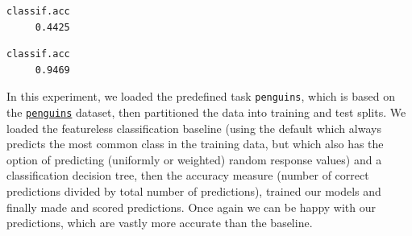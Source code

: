 \begin{Shaded}
\begin{Highlighting}[]
\NormalTok{(}\NormalTok{)}
\OtherTok{=} \NormalTok{(}\NormalTok{)}
\OtherTok{=} 
\OtherTok{=} \NormalTok{(}\NormalTok{)}
\OtherTok{=} \NormalTok{(}\NormalTok{, } \NormalTok{, } \NormalTok{)}
\OtherTok{=} \NormalTok{(}\NormalTok{)}
\SpecialCharTok{$}\SpecialCharTok{$}
\SpecialCharTok{$}\SpecialCharTok{$}
\SpecialCharTok{$}\SpecialCharTok{$}\SpecialCharTok{$}
\end{Highlighting}
\end{Shaded}

\begin{verbatim}
classif.acc 
     0.4425 
\end{verbatim}

\begin{Shaded}
\begin{Highlighting}[]
\SpecialCharTok{$}\SpecialCharTok{$}\SpecialCharTok{$}
\end{Highlighting}
\end{Shaded}

\begin{verbatim}
classif.acc 
     0.9469 
\end{verbatim}

In this experiment, we loaded the predefined task \texttt{penguins},
which is based on the
\href{https://www.rdocumentation.org/packages/palmerpenguins/topics/penguins}{\texttt{penguins}}
dataset, then partitioned the data into training and test splits. We
loaded the featureless classification baseline (using the default which
always predicts the most common class in the training data, but which
also has the option of predicting (uniformly or weighted) random
response values) and a classification decision tree, then the accuracy
measure (number of correct predictions divided by total number of
predictions), trained our models and finally made and scored
predictions. Once again we can be happy with our predictions, which are
vastly more accurate than the baseline.

